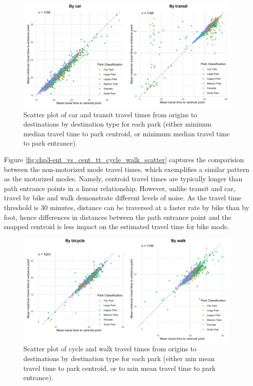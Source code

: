 \documentclass[
11pt, %
oneside, %
english, %
singlespacing, %
]{macthesis} %
\begin{document}
\begin{figure}

{\centering \includegraphics[width=6in]{./data/figures/chp3-ent_vs_cent_tt_transit_car_scatter} 

}

\caption{\label{fig:chp3-ent_vs_cent_tt_car_transit_scatter} Scatter plot of car and transit travel times from origins to destinations by destination type for each park (either mininum median travel time to park centroid, or minimum median travel time to park entrance). }\label{fig:unnamed-chunk-48}
\end{figure}

Figure \ref{fig:chp3-ent_vs_cent_tt_cycle_walk_scatter} captures the comparision between the non-motorized mode travel times, which exemplifies a similar pattern as the motorized modes. Namely, centroid travel times are typically longer than path entrance points in a linear relationship. However, unlike transit and car, travel by bike and walk demonstrate different levels of noise. As the travel time threshold is 30 minutes, distance can be traversed at a faster rate by bike than by foot, hence differences in distances between the path entrance point and the snapped centroid is less impact on the estimated travel time for bike mode.

\begin{figure}

{\centering \includegraphics[width=6in]{./data/figures/chp3-ent_vs_cent_tt_walk_cycle_scatter} 

}

\caption{\label{fig:chp3-ent_vs_cent_tt_cycle_walk_scatter}  Scatter plot of cycle and walk travel times from origins to destinations by destination type for each park (either min mean travel time to park centroid, or to min mean travel time to park entrance). }\label{fig:unnamed-chunk-49}
\end{figure}
\end{document}
